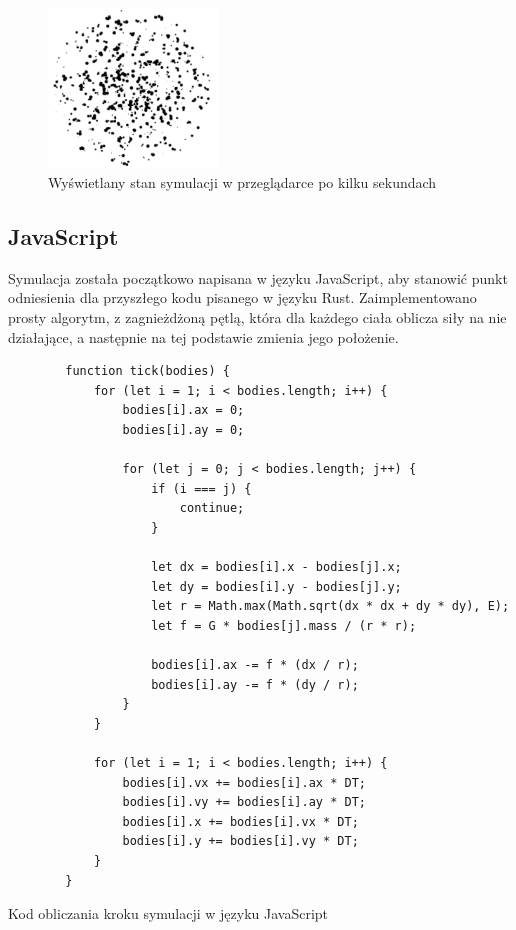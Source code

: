 \documentclass[language=polish,type=master]{aghmodern}
\begin{document}
\begin{figure}[H]
    \centering
    \includegraphics[width=0.4\textwidth]{images/nbody.pdf}
    \caption{Wyświetlany stan symulacji w przeglądarce po kilku sekundach}
    \label{fig:nbody_screenshot}
\end{figure}

\subsection{JavaScript}
Symulacja została początkowo napisana w języku JavaScript, aby stanowić punkt odniesienia dla przyszłego kodu pisanego w języku Rust.
Zaimplementowano prosty algorytm, z zagnieżdżoną pętlą, która dla każdego ciała oblicza siły na nie działające, a następnie na tej podstawie zmienia jego położenie.

\begin{listing}[H]
    \begin{verbatim}
        function tick(bodies) {
            for (let i = 1; i < bodies.length; i++) {
                bodies[i].ax = 0;
                bodies[i].ay = 0;

                for (let j = 0; j < bodies.length; j++) {
                    if (i === j) {
                        continue;
                    }

                    let dx = bodies[i].x - bodies[j].x;
                    let dy = bodies[i].y - bodies[j].y;
                    let r = Math.max(Math.sqrt(dx * dx + dy * dy), E);
                    let f = G * bodies[j].mass / (r * r);

                    bodies[i].ax -= f * (dx / r);
                    bodies[i].ay -= f * (dy / r);
                }
            }

            for (let i = 1; i < bodies.length; i++) {
                bodies[i].vx += bodies[i].ax * DT;
                bodies[i].vy += bodies[i].ay * DT;
                bodies[i].x += bodies[i].vx * DT;
                bodies[i].y += bodies[i].vy * DT;
            }
        }
    \end{verbatim}
    \caption{Kod obliczania kroku symulacji w języku JavaScript}
\end{listing}
\end{document}
